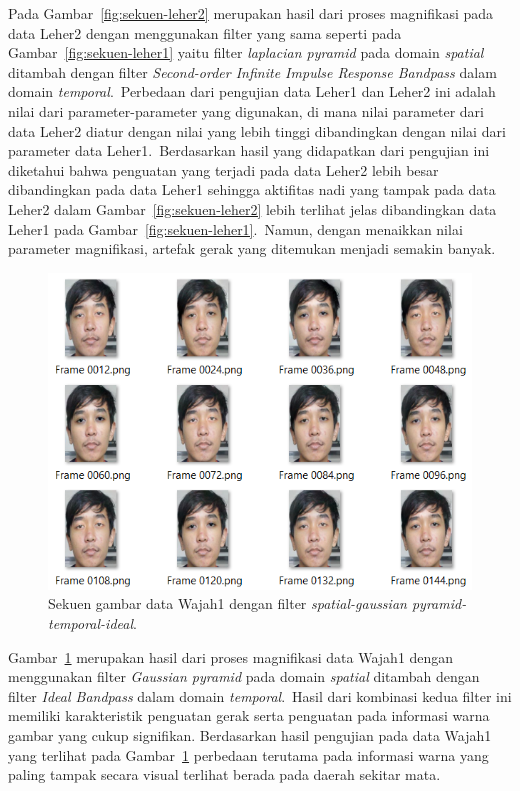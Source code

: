Pada Gambar~\ref{fig:sekuen-leher2} merupakan hasil dari proses magnifikasi pada data Leher2 dengan menggunakan filter yang sama seperti pada Gambar~\ref{fig:sekuen-leher1} yaitu filter \textit{laplacian pyramid} pada domain \textit{spatial} ditambah dengan filter \textit{Second-order Infinite Impulse Response Bandpass} dalam domain \textit{temporal}.~Perbedaan dari pengujian data Leher1 dan Leher2 ini adalah nilai dari parameter-parameter yang digunakan, di mana nilai parameter dari data Leher2 diatur dengan nilai yang lebih tinggi dibandingkan dengan nilai dari parameter data Leher1.~Berdasarkan hasil yang didapatkan dari pengujian ini diketahui bahwa penguatan yang terjadi pada data Leher2 lebih besar dibandingkan pada data Leher1 sehingga aktifitas nadi yang tampak pada data Leher2 dalam Gambar~\ref{fig:sekuen-leher2} lebih terlihat jelas dibandingkan data Leher1 pada Gambar~\ref{fig:sekuen-leher1}.~Namun, dengan menaikkan nilai parameter magnifikasi, artefak gerak yang ditemukan menjadi semakin banyak.
\newpage
\begin{figure}[ht]
	\vspace{0.5em}
	\centering
	\includegraphics[width=\textwidth,height=0.5\linewidth]{data-wajah1}
	\caption{Sekuen gambar data Wajah1 dengan filter \textit{spatial-gaussian pyramid-temporal-ideal}.}
	\label{fig:sekuen-wajah1}   
\end{figure}
Gambar~\ref{fig:sekuen-wajah1} merupakan hasil dari proses magnifikasi data Wajah1 dengan menggunakan filter \textit{Gaussian pyramid} pada domain \textit{spatial} ditambah dengan filter \textit{Ideal Bandpass} dalam domain \textit{temporal}.~Hasil dari kombinasi kedua filter ini memiliki karakteristik penguatan gerak serta penguatan pada informasi warna gambar yang cukup signifikan. Berdasarkan hasil pengujian pada data Wajah1 yang terlihat pada Gambar~\ref{fig:sekuen-wajah1} perbedaan terutama pada informasi warna yang paling tampak secara visual terlihat berada pada daerah sekitar mata.

